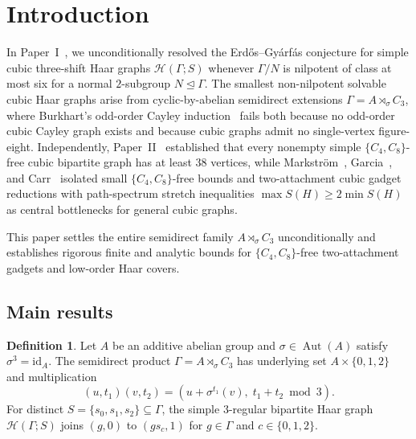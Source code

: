 \documentclass[11pt]{amsart}
\theoremstyle{definition}
\newtheorem{definition}[theorem]{Definition}
\theoremstyle{remark}
\newcommand{\Haar}{\mathcal{H}}
\newcommand{\Aut}{\operatorname{Aut}}
\newcommand{\id}{\mathrm{id}}
\begin{document}
\maketitle

\section{Introduction}

In Paper~I~\cite{Paper1}, we unconditionally resolved the Erd\H{o}s--Gy\'arf\'as conjecture for simple cubic three-shift Haar graphs $\Haar(\Gamma; S)$ whenever $\Gamma/N$ is nilpotent of class at most six for a normal $2$-subgroup $N \trianglelefteq \Gamma$. The smallest non-nilpotent solvable cubic Haar graphs arise from cyclic-by-abelian semidirect extensions $\Gamma = A \rtimes_\sigma C_3$, where Burkhart's odd-order Cayley induction~\cite{Burkhart2026} fails both because no odd-order cubic Cayley graph exists and because cubic graphs admit no single-vertex figure-eight. Independently, Paper~II~\cite{Paper2} established that every nonempty simple $\{C_4, C_8\}$-free cubic bipartite graph has at least $38$ vertices, while Markstr\"om~\cite{Markstrom2004}, Garcia~\cite{Garcia2026}, and Carr~\cite{Carr2026} isolated small $\{C_4, C_8\}$-free bounds and two-attachment cubic gadget reductions with path-spectrum stretch inequalities $\max S(H) \ge 2 \min S(H)$ as central bottlenecks for general cubic graphs.

This paper settles the entire semidirect family $A \rtimes_\sigma C_3$ unconditionally and establishes rigorous finite and analytic bounds for $\{C_4, C_8\}$-free two-attachment gadgets and low-order Haar covers.

\subsection{Main results}

\begin{definition}
Let $A$ be an additive abelian group and $\sigma \in \Aut(A)$ satisfy $\sigma^3 = \id_A$. The semidirect product $\Gamma = A \rtimes_\sigma C_3$ has underlying set $A \times \{0,1,2\}$ and multiplication
\[
(u, t_1)(v, t_2) = (u + \sigma^{t_1}(v),\; t_1 + t_2 \bmod 3).
\]
For distinct $S = \{s_0, s_1, s_2\} \subseteq \Gamma$, the simple $3$-regular bipartite Haar graph $\Haar(\Gamma; S)$ joins $(g, 0)$ to $(g s_c, 1)$ for $g \in \Gamma$ and $c \in \{0,1,2\}$.
\end{definition}
\end{document}
